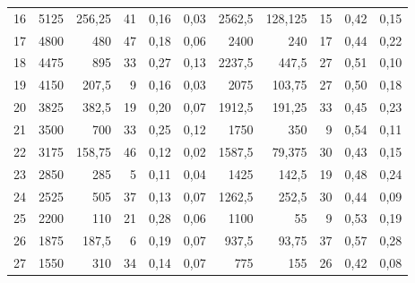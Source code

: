 \documentclass[preprint,12pt]{elsarticle}
\begin{document}
\begin{table}[htbp]
\begin{tabular}{rrrrrrrrrrr}
    16    & 5125  & 256,25 & 41    & 0,16  & 0,03  & 2562,5 & 128,125 & 15    & 0,42  & 0,15 \\
    17    & 4800  & 480   & 47    & 0,18  & 0,06  & 2400  & 240   & 17    & 0,44  & 0,22 \\
    18    & 4475  & 895   & 33    & 0,27  & 0,13  & 2237,5 & 447,5 & 27    & 0,51  & 0,10 \\
    19    & 4150  & 207,5 & 9     & 0,16  & 0,03  & 2075  & 103,75 & 27    & 0,50  & 0,18 \\
    20    & 3825  & 382,5 & 19    & 0,20  & 0,07  & 1912,5 & 191,25 & 33    & 0,45  & 0,23 \\
    21    & 3500  & 700   & 33    & 0,25  & 0,12  & 1750  & 350   & 9     & 0,54  & 0,11 \\
    22    & 3175  & 158,75 & 46    & 0,12  & 0,02  & 1587,5 & 79,375 & 30    & 0,43  & 0,15 \\
    23    & 2850  & 285   & 5     & 0,11  & 0,04  & 1425  & 142,5 & 19    & 0,48  & 0,24 \\
    24    & 2525  & 505   & 37    & 0,13  & 0,07  & 1262,5 & 252,5 & 30    & 0,44  & 0,09 \\
    25    & 2200  & 110   & 21    & 0,28  & 0,06  & 1100  & 55    & 9     & 0,53  & 0,19 \\
    26    & 1875  & 187,5 & 6     & 0,19  & 0,07  & 937,5 & 93,75 & 37    & 0,57  & 0,28 \\
    27    & 1550  & 310   & 34    & 0,14  & 0,07  & 775   & 155   & 26    & 0,42  & 0,08 \\
    \bottomrule
    \end{tabular}%
  \label{tab:addlabel}%
\end{table}%
\end{document}
